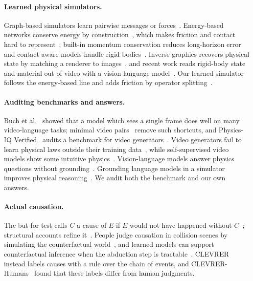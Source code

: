 \documentclass[10pt,twocolumn,letterpaper]{article}
\providecommand{\etal}{et al.}
\begin{document}
\paragraph{Learned physical simulators.}
Graph-based simulators learn pairwise messages or forces~\cite{battaglia2016interaction,li2019propnet,sanchez2020gns}.
Energy-based networks conserve energy by construction~\cite{greydanus2019hnn,cranmer2020lnn,sanchez2019hgn,wang2026moshwm}, which makes friction and contact hard to represent~\cite{sosanya2022dissipative,gruver2022deconstructing}; built-in momentum conservation reduces long-horizon error~\cite{sharma2026dynamical} and contact-aware models handle rigid bodies~\cite{allen2023fignet}.
Inverse graphics recovers physical state by matching a renderer to images~\cite{wu2015galileo,wu2017deanimation}, and recent work reads rigid-body state and material out of video with a vision-language model~\cite{kao2026dynamics}.
Our learned simulator follows the energy-based line and adds friction by operator splitting~\cite{hairer2006geometric}.

\paragraph{Auditing benchmarks and answers.}
Buch \etal~\cite{buch2022revisiting} showed that a model which sees a single frame does well on many video-language tasks; minimal video pairs~\cite{krojer2025mvp} remove such shortcuts, and Physics-IQ Verified~\cite{radsch2026verified} audits a benchmark for video generators~\cite{motamed2026physicsiq}.
Video generators fail to learn physical laws outside their training data~\cite{kang2025howfar}, while self-supervised video models show some intuitive physics~\cite{garrido2025intuitive}.
Vision-language models answer physics questions without grounding~\cite{chow2025physbench,bagdonaviciute2025physics,bourigault2026words}.
Grounding language models in a simulator improves physical reasoning~\cite{liu2023mindseye,cherian2026llmphy,balazadeh2025pcb}.
We audit both the benchmark and our own answers.

\paragraph{Actual causation.}
The but-for test calls $C$ a cause of $E$ if $E$ would not have happened without $C$~\cite{lewis1973causation}; structural accounts refine it~\cite{halpern2005causes,halpern2016actual}.
People judge causation in collision scenes by simulating the counterfactual world~\cite{gerstenberg2021csm}, and learned models can support counterfactual inference when the abduction step is tractable~\cite{pawlowski2020deepscm,schoelkopf2021toward}.
CLEVRER instead labels causes with a rule over the chain of events, and CLEVRER-Humans~\cite{mao2022clevrerhumans} found that these labels differ from human judgments.
\end{document}
